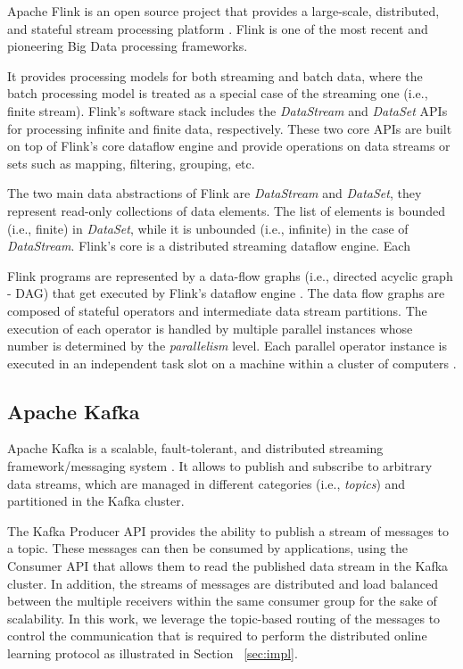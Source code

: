 \par Apache Flink is an open source project that provides a large-scale, distributed, and stateful stream processing platform \cite{carbone2015apache}. Flink is one of the most recent and pioneering Big Data processing frameworks.

\par  It provides processing models for both streaming and batch data, where the batch processing model is treated as a special case of the streaming one (i.e., finite stream). Flink's software stack includes the \textit{DataStream} and \textit{DataSet} APIs for processing infinite and finite data, respectively. These two core APIs are built on top of Flink's core dataflow engine and provide operations on data streams or sets such as mapping, filtering, grouping, etc.

\par The two main data abstractions of Flink are \textit{DataStream} and \textit{DataSet},  they represent read-only collections of data elements. The list of elements is bounded (i.e., finite) in \textit{DataSet}, while it is unbounded (i.e., infinite) in the case of \textit{DataStream}. Flink's core is a distributed streaming dataflow engine. Each
\par Flink programs are represented by a data-flow graphs (i.e., directed acyclic graph - DAG) that get executed by Flink's dataflow engine \cite{carbone2015apache}. The data flow graphs are composed of stateful operators and intermediate data stream partitions.  The execution of each operator is handled by multiple parallel instances whose number is determined by the \textit{parallelism} level. Each parallel operator instance is executed in an independent task slot on a machine within a cluster of computers \cite{Flink}.    

\subsection{Apache Kafka}

\par Apache Kafka is a scalable, fault-tolerant, and distributed streaming framework/messaging system \cite{Kafka}. It allows to publish and subscribe to arbitrary data streams, which are managed in different categories (i.e., \textit{topics}) and  partitioned in the Kafka cluster. 
\par The Kafka Producer API provides the ability to publish a stream of messages to a topic. These messages can then be consumed by applications, using the Consumer API that allows them to read the published data stream in the Kafka cluster. In addition, the streams of messages are distributed and load balanced between the multiple receivers within the same consumer group for the sake of scalability. In this work, we leverage the topic-based routing of the messages to control the communication that is required to perform the distributed online learning protocol as illustrated in Section ~\ref{sec:impl}.    
  





